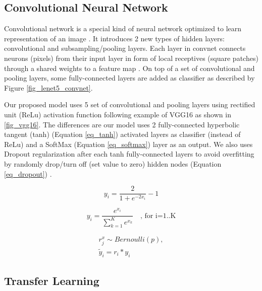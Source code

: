 \documentclass[conference]{IEEEtran}
\begin{document}
\subsection{Convolutional Neural Network}

Convolutional network is a special kind of neural network optimized to learn representation of an image \cite{lecun2015deep}. It introduces 2 new types of hidden layers: convolutional and subsampling/pooling layers. Each layer in convnet connects neurons (pixels) from their input layer in form of local receptives (square patches) through a shared weights to a feature map \cite{lecun1998gradient}. On top of a set of convolutional and pooling layers, some fully-connected layers are added as classifier as described by Figure \ref{fig_lenet5_convnet}.

Our proposed model uses 5 set of convolutional and pooling layers using rectified unit (ReLu) activation function following example of VGG16 as shown in \ref{fig_vgg16}. The differences are our model uses 2 fully-connected hyperbolic tangent (tanh) (Equation \ref{eq_tanh}) activated layers as classifier (instead of ReLu) and a SoftMax (Equation \ref{eq_softmax}) layer as an output. We also uses Dropout regularization after each tanh fully-connected layers to avoid overfitting by randomly drop/turn off (set value to zero) hidden nodes (Equation \ref{eq_dropout}) \cite{srivastava2014dropout}.

\begin{equation}
y_{i}={\frac {2}{1+e^{-2x _{i}}}}-1
\label{eq_tanh}
\end{equation}


\begin{equation}
y_{i}={\frac {e^{x _{i}}}{\sum _{k=1}^K e^{x _{k}}}} \quad \text{, for i=1..K}
\label{eq_softmax}
\end{equation}

\begin{align}
r_{j}^{x} \sim Bernoulli(p), \nonumber \\
\tilde{y} _{i}= r _{i} * y _{i}
\label{eq_dropout}
\end{align}

\subsection{Transfer Learning}
\end{document}
